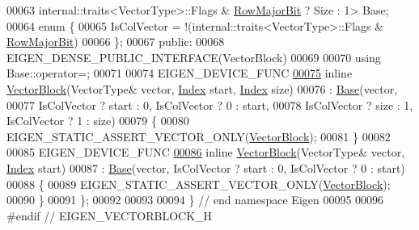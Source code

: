 \begin{DoxyCode}
00063                      internal::traits<VectorType>::Flags & \hyperlink{group__flags_gae4f56c2a60bbe4bd2e44c5b19cbe8762}{RowMajorBit} ? Size : 1> Base;
00064     \textcolor{keyword}{enum} \{
00065       IsColVector = !(internal::traits<VectorType>::Flags & \hyperlink{group__flags_gae4f56c2a60bbe4bd2e44c5b19cbe8762}{RowMajorBit})
00066     \};
00067   \textcolor{keyword}{public}:
00068     EIGEN\_DENSE\_PUBLIC\_INTERFACE(VectorBlock)
00069 
00070     \textcolor{keyword}{using} Base::operator=;
00071 
00074     EIGEN\_DEVICE\_FUNC
\hyperlink{group___core___module_a4bd5eb61b2c420218269a111d717dbb7}{00075}     \textcolor{keyword}{inline} \hyperlink{group___core___module_a4bd5eb61b2c420218269a111d717dbb7}{VectorBlock}(VectorType& vector, \hyperlink{namespace_eigen_a62e77e0933482dafde8fe197d9a2cfde}{Index} start, \hyperlink{namespace_eigen_a62e77e0933482dafde8fe197d9a2cfde}{Index} size)
00076       : \hyperlink{group___core___module}{Base}(vector,
00077              IsColVector ? start : 0, IsColVector ? 0 : start,
00078              IsColVector ? size  : 1, IsColVector ? 1 : size)
00079     \{
00080       EIGEN\_STATIC\_ASSERT\_VECTOR\_ONLY(\hyperlink{group___core___module_class_eigen_1_1_vector_block}{VectorBlock});
00081     \}
00082 
00085     EIGEN\_DEVICE\_FUNC
\hyperlink{group___core___module_a94bcec1eda40d989b2fbcc70f343fa8f}{00086}     \textcolor{keyword}{inline} \hyperlink{group___core___module_a94bcec1eda40d989b2fbcc70f343fa8f}{VectorBlock}(VectorType& vector, \hyperlink{namespace_eigen_a62e77e0933482dafde8fe197d9a2cfde}{Index} start)
00087       : \hyperlink{group___core___module}{Base}(vector, IsColVector ? start : 0, IsColVector ? 0 : start)
00088     \{
00089       EIGEN\_STATIC\_ASSERT\_VECTOR\_ONLY(\hyperlink{group___core___module_class_eigen_1_1_vector_block}{VectorBlock});
00090     \}
00091 \};
00092 
00093 
00094 \} \textcolor{comment}{// end namespace Eigen}
00095 
00096 \textcolor{preprocessor}{#endif // EIGEN\_VECTORBLOCK\_H}
\end{DoxyCode}
